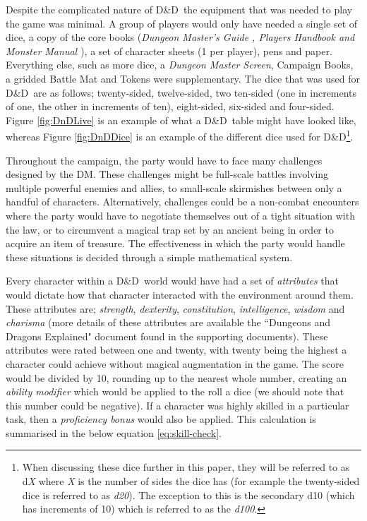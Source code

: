 \documentclass[final]{cmpreport}
\newcommand{\dnd}{D\&D}
\begin{document}
			Despite the complicated nature of \dnd \ the equipment that was needed to play the game was minimal. A group of players would only have needed a single set of dice, a copy of the core books (\emph{Dungeon Master's Guide \citep{DMGuide}, Players Handbook and Monster Manual \citep{MonsterManual}}), a set of character sheets (1 per player), pens and paper. Everything else, such as more dice, a \emph{Dungeon Master Screen}, Campaign Books, a gridded Battle Mat and Tokens were supplementary. The dice that was used for \dnd \ are as follows; twenty-sided, twelve-sided, two ten-sided (one in increments of one, the other in increments of ten), eight-sided, six-sided and four-sided. Figure \ref{fig:DnDLive} is an example of what a \dnd \ table might have looked like, whereas Figure \ref{fig:DnDDice} is an example of the different dice used for \dnd \footnote{When discussing these dice further in this paper, they will be referred to as d\emph{X} where \emph{X} is the number of sides the dice has (for example the twenty-sided dice is referred to as \emph{d20}). The exception to this is the secondary d10 (which has increments of 10) which is referred to as the \emph{d100}.}.
			
			Throughout the campaign, the party would have to face many challenges designed by the DM. These challenges might be full-scale battles involving multiple powerful enemies and allies, to small-scale skirmishes between only a handful of characters. Alternatively, challenges could be a non-combat encounters where the party would have to negotiate themselves out of a tight situation with the law, or to circumvent a magical trap set by an ancient being in order to acquire an item of treasure. The effectiveness in which the party would handle these situations is decided through a simple mathematical system. 
			
			Every character within a \dnd \ world would have had a set of \emph{attributes} that would dictate how that character interacted with the environment around them. These attributes are; \emph{strength}, \emph{dexterity}, \emph{constitution}, \emph{intelligence}, \emph{wisdom} and \emph{charisma} (more details of these attributes are available the ``Dungeons and Dragons Explained" document found in the supporting documents). These attributes were rated between one and twenty, with twenty being the highest a character could achieve without magical augmentation in the game. The score would be divided by 10, rounding up to the nearest whole number, creating an \emph{ability modifier} which would be applied to the roll a dice (we should note that this number could be negative). If a character was highly skilled in a particular task, then a \emph{proficiency bonus} would also be applied. This calculation is summarised in the below equation \ref{eq:skill-check}. 
			
\end{document}
